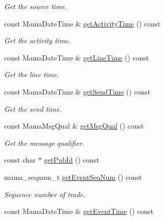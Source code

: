 \begin{CompactItemize}
\begin{CompactList}\small\item\em Get the source time. \item\end{CompactList}\item 
const Mama\-Date\-Time \& \hyperlink{classWombat_1_1MamdaTradeListener_6262a8a8952d505d580832d5f7bec078}{get\-Activity\-Time} () const 
\begin{CompactList}\small\item\em Get the activity time. \item\end{CompactList}\item 
const Mama\-Date\-Time \& \hyperlink{classWombat_1_1MamdaTradeListener_1bdc7c259fc34f4e4e43e2e97953ba97}{get\-Line\-Time} () const 
\begin{CompactList}\small\item\em Get the line time. \item\end{CompactList}\item 
const Mama\-Date\-Time \& \hyperlink{classWombat_1_1MamdaTradeListener_db49cd3341a07e0659b16b6166d56c3a}{get\-Send\-Time} () const 
\begin{CompactList}\small\item\em Get the send time. \item\end{CompactList}\item 
const Mama\-Msg\-Qual \& \hyperlink{classWombat_1_1MamdaTradeListener_99049505686f05acab6e3c84c0d0b5b1}{get\-Msg\-Qual} () const 
\begin{CompactList}\small\item\em Get the message qualifier. \item\end{CompactList}\item 
const char $\ast$ \hyperlink{classWombat_1_1MamdaTradeListener_8d34c323fa0ca67ffbdc40625a84bf62}{get\-Pub\-Id} () const 
\item 
mama\_\-seqnum\_\-t \hyperlink{classWombat_1_1MamdaTradeListener_8289ac1ca750b7fb99e29c122e37caad}{get\-Event\-Seq\-Num} () const 
\begin{CompactList}\small\item\em Sequence number of trade. \item\end{CompactList}\item 
const Mama\-Date\-Time \& \hyperlink{classWombat_1_1MamdaTradeListener_be370d422774375f2724162d7bfe65c2}{get\-Event\-Time} () const 

\end{CompactItemize}
